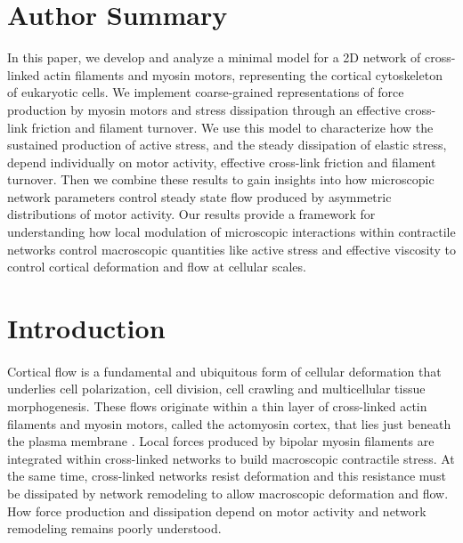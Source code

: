 \documentclass[10pt,letterpaper]{article}
\begin{document}
\section*{Author Summary}
In this paper, we develop and analyze a minimal model for a 2D network of cross-linked actin filaments and myosin motors, representing the cortical cytoskeleton of eukaryotic cells.  We implement coarse-grained representations of force production by myosin motors and stress dissipation through an effective cross-link friction and filament turnover. We use this model to characterize how the sustained production of active stress, and the steady dissipation of elastic stress, depend individually on motor activity,  effective cross-link friction and filament turnover. Then we combine these results to gain insights into how microscopic network parameters control steady state flow produced by asymmetric distributions of motor activity. Our results provide a framework for understanding how local modulation of microscopic interactions within contractile networks control macroscopic quantities like active stress and effective viscosity to control cortical deformation and flow at cellular scales.  

\linenumbers

\section*{Introduction}

\paragraph{}  Cortical flow is a fundamental and ubiquitous form of cellular deformation that underlies cell polarization, cell division, cell crawling and multicellular tissue morphogenesis\cite{cellmech_flows3,cellmech_flows2,Benink:2000aa,Wilson:2010aa,Rauzi2010,Munro2004413}. These flows originate within a thin layer of cross-linked actin filaments and myosin motors, called the actomyosin cortex, that lies just beneath the plasma membrane \cite{Salbreux2012536}. Local forces produced by bipolar myosin filaments are integrated within cross-linked networks to build macroscopic contractile stress\cite{Murrell:2015aa,Bendix20083126,Janson1005}.  At the same time, cross-linked networks resist deformation and this resistance must be dissipated by network remodeling to allow macroscopic deformation and flow.  How force production and dissipation depend on motor activity and network remodeling remains poorly understood.
\end{document}

